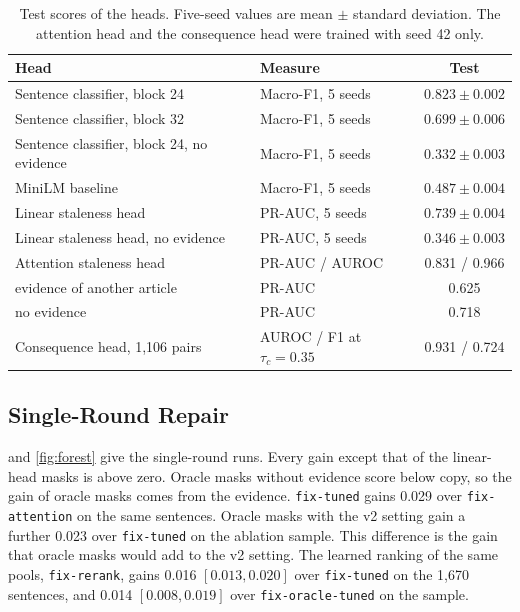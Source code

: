 \documentclass[]{paper}
\newcommand{\run}[1]{\texttt{#1}}
\begin{document}
\begin{table}[H]
\caption{Test scores of the heads. Five-seed values are mean $\pm$ standard deviation. The attention head and the consequence head were trained with seed 42 only.}
\label{tab:heads}
\centering
\footnotesize
\begin{tabular}{llc}
\toprule
Head & Measure & Test \\
\midrule
Sentence classifier, block 24 & Macro-F1, 5 seeds & $0.823 \pm 0.002$ \\
Sentence classifier, block 32 & Macro-F1, 5 seeds & $0.699 \pm 0.006$ \\
Sentence classifier, block 24, no evidence & Macro-F1, 5 seeds & $0.332 \pm 0.003$ \\
MiniLM baseline & Macro-F1, 5 seeds & $0.487 \pm 0.004$ \\
\midrule
Linear staleness head & PR-AUC, 5 seeds & $0.739 \pm 0.004$ \\
Linear staleness head, no evidence & PR-AUC, 5 seeds & $0.346 \pm 0.003$ \\
Attention staleness head & PR-AUC / AUROC & 0.831 / 0.966 \\
\quad evidence of another article & PR-AUC & 0.625 \\
\quad no evidence & PR-AUC & 0.718 \\
\midrule
Consequence head, 1,106 pairs & AUROC / F1 at $\tau_c = 0.35$ & 0.931 / 0.724 \\
\bottomrule
\end{tabular}
\end{table}

\subsection{Single-Round Repair}

 and \cref{fig:forest} give the single-round runs. Every gain except that of the linear-head masks is above zero. Oracle masks without evidence score below copy, so the gain of oracle masks comes from the evidence. \run{fix-tuned} gains 0.029 over \run{fix-attention} on the same sentences. Oracle masks with the v2 setting gain a further 0.023 over \run{fix-tuned} on the ablation sample. This difference is the gain that oracle masks would add to the v2 setting. The learned ranking of the same pools, \run{fix-rerank}, gains 0.016 $[0.013, 0.020]$ over \run{fix-tuned} on the 1,670 sentences, and 0.014 $[0.008, 0.019]$ over \run{fix-oracle-tuned} on the sample.
\end{document}
